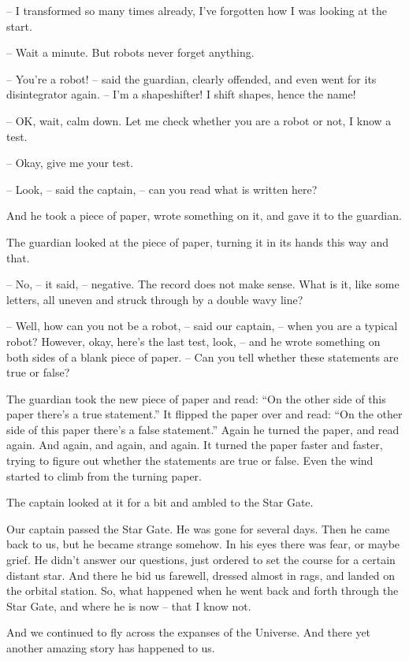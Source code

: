 \documentclass[ebook,twoside,final,openright]{memoir}
\begin{document}
– I transformed so many times already, I’ve forgotten how I was looking at the start.\par
– Wait a minute. But robots never forget anything.\par
– You’re a robot! – said the guardian, clearly offended, and even went for its disintegrator again. – I’m a shapeshifter! I shift shapes, hence the name!\par
– OK, wait, calm down. Let me check whether you are a robot or not, I know a test.\par
– Okay, give me your test.\par
– Look, – said the captain, – can you read what is written here?\par
And he took a piece of paper, wrote something on it, and gave it to the guardian.\par
The guardian looked at the piece of paper, turning it in its hands this way and that.\par
– No, – it said, – negative. The record does not make sense. What is it, like some letters, all uneven and struck through by a double wavy line?\par
– Well, how can you not be a robot, – said our captain, – when you are a typical robot? However, okay, here's the last test, look, – and he wrote something on both sides of a blank piece of paper. – Can you tell whether these statements are true or false?\par
\par
The guardian took the new piece of paper and read: “On the other side of this paper there’s a true statement.” It flipped the paper over and read: “On the other side of this paper there’s a false statement.” Again he turned the paper, and read again. And again, and again, and again. It turned the paper faster and faster, trying to figure out whether the statements are true or false. Even the wind started to climb from the turning paper.\par
\par
The captain looked at it for a bit and ambled to the Star Gate.\par
Our captain passed the Star Gate. He was gone for several days. Then he came back to us, but he became strange somehow. In his eyes there was fear, or maybe grief. He didn’t answer our questions, just ordered to set the course for a certain distant star. And there he bid us farewell, dressed almost in rags, and landed on the orbital station. So, what happened when he went back and forth through the Star Gate, and where he is now – that I know not. \par
\par
 And we continued to fly across the expanses of the Universe. And there yet another amazing story has happened to us.
\end{document}

